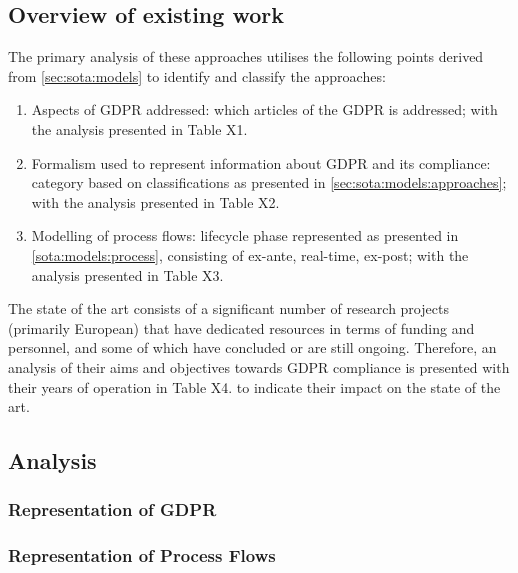 \subsection{Overview of existing work}
The primary analysis of these approaches utilises the following points derived from \autoref{sec:sota:models} to identify and classify the approaches:
\begin{enumerate}
    \item Aspects of GDPR addressed: which articles of the GDPR is addressed; with the analysis presented in Table X1. %
    \item Formalism used to represent information about GDPR and its compliance: category based on classifications \cite{otto_addressing_2007} as presented in \autoref{sec:sota:models:approaches}; with the analysis presented in Table X2. %
    \item Modelling of process flows: lifecycle phase \cite{fellmann_state---art_2014} represented as presented in \autoref{sota:models:process}, consisting of ex-ante, real-time, ex-post; with the analysis presented in Table X3. %
\end{enumerate}

The state of the art consists of a significant number of research projects (primarily European) that have dedicated resources in terms of funding and personnel, and some of which have concluded or are still ongoing.
Therefore, an analysis of their aims and objectives towards GDPR compliance is presented with their years of operation in Table X4. to indicate their impact on the state of the art.

\subsection{Analysis}

\subsubsection{Representation of GDPR}\label{sota:analysis:representation}

\subsubsection{Representation of Process Flows}\label{sota:analysis:process-flows}


